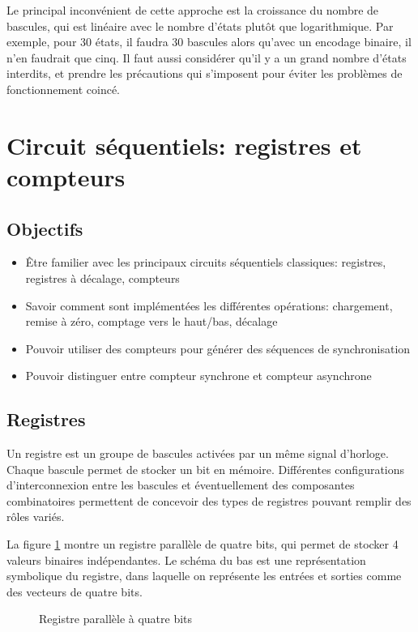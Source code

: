 \documentclass[11pt]{article}
\begin{document}
Le principal inconvénient de cette approche est la croissance du
nombre de bascules, qui est linéaire avec le nombre d'états plutôt que
logarithmique. Par exemple, pour 30 états, il faudra 30 bascules alors
qu'avec un encodage binaire, il n'en faudrait que cinq. Il faut aussi
considérer qu'il y a un grand nombre d'états interdits, et prendre les
précautions qui s'imposent pour éviter les problèmes de fonctionnement
coincé.


\section{Circuit séquentiels: registres et compteurs}
\label{sec:orgbebd35b}
\subsection{Objectifs}
\label{sec:org1f2969f}
\begin{itemize}
\item Être familier avec les principaux circuits séquentiels classiques:
registres, registres à décalage, compteurs
\item Savoir comment sont implémentées les différentes opérations:
chargement, remise à zéro, comptage vers le haut/bas, décalage
\item Pouvoir utiliser des compteurs pour générer des séquences de
synchronisation
\item Pouvoir distinguer entre compteur synchrone et compteur asynchrone
\end{itemize}

\subsection{Registres}
\label{sec:org09cf2d6}

Un registre est un groupe de bascules activées par un même signal
d'horloge. Chaque bascule permet de stocker un bit en
mémoire. Différentes configurations d'interconnexion entre les
bascules et éventuellement des composantes combinatoires permettent de
concevoir des types de registres pouvant remplir des rôles variés.

La figure \ref{fig:orge1e24ef} montre un registre parallèle de quatre bits,
qui permet de stocker 4 valeurs binaires indépendantes. Le schéma du
bas est une représentation symbolique du registre, dans laquelle on
représente les entrées et sorties comme des vecteurs de quatre bits.

\begin{figure}[htbp]
\centering

\caption{\label{fig:orge1e24ef}Registre parallèle à quatre bits}
\end{figure}
\end{document}
